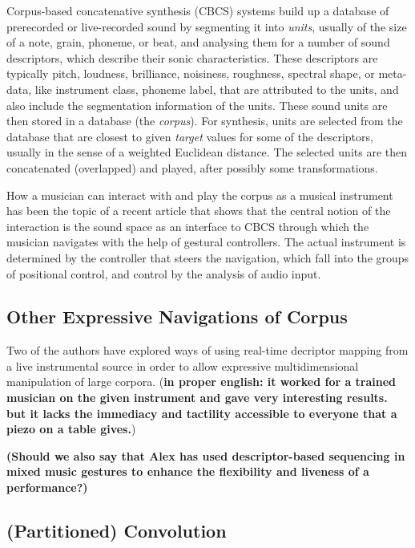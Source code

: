 Corpus-based concatenative synthesis (CBCS) \cite{Schwarz-ieeespm2007-concat} systems build up a database of prerecorded or live-recorded sound by segmenting it into
\textit{units}, usually of the size of a note, grain, phoneme, or beat, and analysing them for a
number of sound descriptors, which describe their sonic characteristics.
These descriptors are typically pitch, loudness, brilliance, noisiness, roughness, spectral shape, or meta-data, like instrument class, phoneme label, that are attributed to the units,
and also include the segmentation information of the units.
These sound units are then stored in a database (the \textit{corpus}).  For synthesis, units are
selected from the database that are closest to given \textit{target} values for some of the
descriptors, usually in the sense of a weighted Euclidean distance.
The selected units are then concatenated (overlapped) and played, after possibly some transformations.


How a musician can interact with and play the corpus as a musical instrument has been the topic of a recent article \cite{Schwarz-nime2012-sound-space} that shows that the central notion of the interaction is the sound space as an interface to CBCS through which the musician navigates with the help of gestural controllers.  
The actual instrument is determined by the controller that steers the
navigation, which fall into the groups of positional control, and control by the analysis of audio
input.

\subsection{Other Expressive Navigations of Corpus}

Two of the authors have explored ways of using real-time decriptor mapping from a live instrumental source in order to allow expressive multidimensional manipulation of large corpora. (\textbf{in proper english: it worked for a trained musician on the given instrument and gave very interesting results. but it lacks the immediacy and tactility accessible to everyone that a piezo on a table gives.})

\textbf{(Should we also say that Alex has used descriptor-based sequencing in mixed music gestures to enhance the flexibility and liveness of a performance?)}

\subsection{(Partitioned) Convolution}

